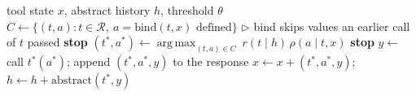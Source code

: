 \begin{algorithm}[tbp]
\caption{The speculator, after each of the agent's tool responses.}
\label{alg:speculator}
\small
\begin{algorithmic}[1]
\Require tool state $x$, abstract history $h$, threshold $\theta$
\Loop
  \State $C \gets \{(t, a) : t \in \mathcal R,\ a = \mathrm{bind}(t, x) \text{ defined}\}$
  \Statex \hspace{\algorithmicindent}\hspace{\algorithmicindent}\textcolor{muted}{$\triangleright$ bind skips values an earlier call of $t$ passed}
   \textbf{stop} \EndIf
  \State $(t^\ast, a^\ast) \gets \operatorname{arg\,max}_{(t, a) \in C}\ r(t \mid h)\,\rho(a \mid t, x)$
   \textbf{stop} \EndIf
  \State $y \gets$ call $t^\ast(a^\ast)$; append $(t^\ast, a^\ast, y)$ to the response
  \State $x \gets x + (t^\ast, a^\ast, y)$;\quad $h \gets h + \mathrm{abstract}(t^\ast, y)$
\EndLoop
\end{algorithmic}
\end{algorithm}
